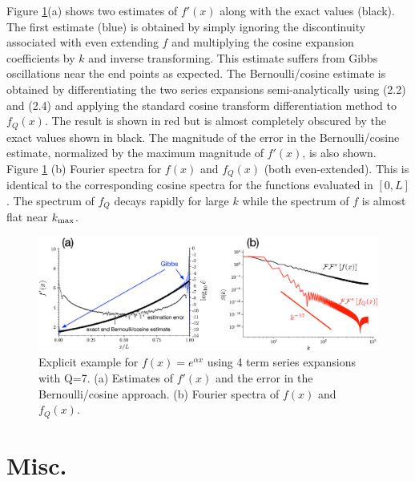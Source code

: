 \documentclass{jfm-like}
\begin{document}
Figure \ref{fig:derivs}(a) shows two estimates of $f'(x)$ along with the exact values (black). The first estimate (blue) is obtained by simply ignoring the discontinuity associated with even extending $f$
and multiplying the cosine expansion coefficients by $k$ and inverse transforming. This estimate suffers from Gibbs oscillations near the end points as expected. 
The Bernoulli/cosine estimate is  obtained by differentiating the two series expansions semi-analytically using (2.2) and (2.4) and applying the standard cosine transform differentiation method to 
 $f_Q(x)$. The result is shown in red but is almost completely obscured by the exact values shown in black.  The magnitude of the error in the Bernoulli/cosine estimate, normalized by the maximum magnitude of $f'(x)$,
  is also shown.
 Figure \ref{fig:derivs} (b) Fourier spectra for $f(x)$ and $f_Q(x)$ (both even-extended). This is identical to the corresponding cosine spectra for the functions evaluated in $[0,L]$. The spectrum of $f_Q$ decays rapidly for large $k$ while the spectrum of $f$ is almost flat near $k_{\rm max}$.
 \begin{figure}
  \centerline{\includegraphics[width=1.0\textwidth]{FIGS/exp_figs/derivs.eps}}
  \caption{Explicit example for $f(x)=e^{\alpha x}$ using 4 term series expansions with Q=7. (a) Estimates of $f'(x)$ and the error in the Bernoulli/cosine approach. (b) Fourier spectra
  of $f(x)$ and $f_Q(x)$.} 
  \label{fig:derivs}
\end{figure}


\section{Misc.}
\end{document}
